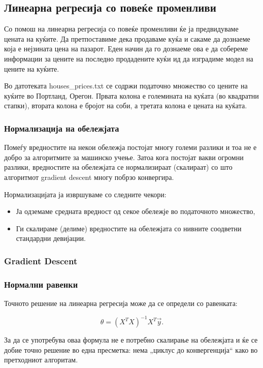 \subsection{Линеарна регресија со повеќе променливи}

Со помош на линеарна регресија со повеќе променливи ќе ја предвидуваме цената на
куќите. Да претпоставиме дека продаваме куќа и сакаме да дознаеме која е
нејзината цена на пазарот. Еден начин да го дознаеме ова е да собереме
информации за цените на последно продадените куќи ид да изградиме модел на
цените на куќите.

Во датотеката houses\_prices.txt се содржи податочно множество со цените на
куќите во Портланд, Орегон. Првата колона е големината на куќата (во квадратни
стапки), втората колона е бројот на соби, а третата колона е цената на куќата.

\subsubsection{Нормализација на обележјата}

Помеѓу вредностите на некои обележја постојат многу големи разлики и тоа не е
добро за алгоритмите за машинско учење. Затоа кога постојат вакви огромни
разлики, вредностите на обележјата се нормализираат (скалираат) со што
алгоритмот gradient descent многу побрзо конвергира. 

Нормализацијата ја извршуваме со следните чекори:
\begin{itemize}
  \item Ја одземаме средната вредност од секое обележје во податочното
  множество,
  \item Ги скалираме (делиме) вредностите на обележјата со нивните соодветни
  стандардни девијации.
\end{itemize}




\subsubsection{Gradient Descent}




\subsubsection{Нормални равенки}
Точното решение на линеарна регресија може да се определи со равенката:

\[
	\theta = (X^TX)^{-1}X^T\vec{y}.
\]

За да се употребува оваа формула не е потребно скалирање на обележјата и ќе се
добие точно решение во една пресметка: нема „циклус до конвергенција“ како во
претходниот алгоритам.

